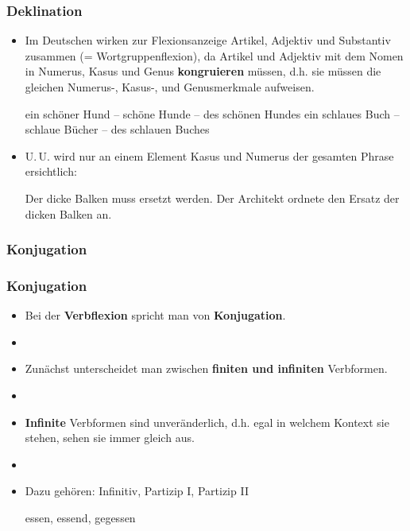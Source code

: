 
\begin{frame}
\frametitle{Deklination}

\begin{itemize}
\item Im Deutschen wirken zur Flexionsanzeige Artikel, Adjektiv und Substantiv zusammen (= Wortgruppenflexion), da Artikel und Adjektiv mit dem Nomen in Numerus, Kasus und Genus \textbf{kongruieren} müssen, d.h. sie müssen die gleichen Numerus-, Kasus-, und Genusmerkmale aufweisen.

\eal 
\ex ein schöner Hund -- schöne Hunde -- des schönen Hundes
\ex ein schlaues Buch -- schlaue Bücher -- des schlauen Buches
\zl

\item U.\,U. wird nur an einem Element Kasus und Numerus der gesamten Phrase ersichtlich:

\eal 
\ex Der dicke Balken muss ersetzt werden.
\ex Der Architekt ordnete den Ersatz der dicken Balken an.
\zl

\end{itemize}


\end{frame}


\subsubsection{Konjugation}



\begin{frame}
\frametitle{Konjugation}

\begin{itemize}
\item Bei der \textbf{Verbflexion} spricht man von \textbf{Konjugation}.
\item[]
\item Zunächst unterscheidet man zwischen \textbf{finiten und infiniten} Verbformen.
\item[]
\item \textbf{Infinite} Verbformen sind unveränderlich, d.h. egal in welchem Kontext sie stehen, sehen sie immer gleich aus.
\item[]
\item Dazu gehören: Infinitiv, Partizip I, Partizip II

\ea essen, essend, gegessen
\z

\end{itemize}


\end{frame}



